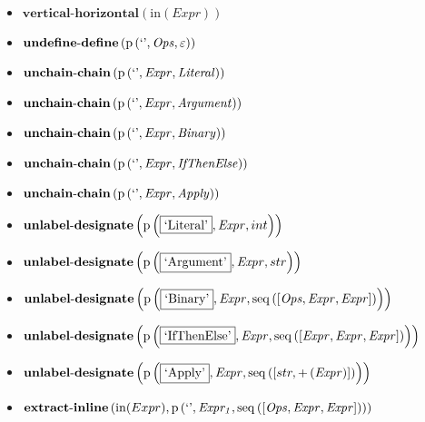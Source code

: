{\begin{itemize}
\item $\mathbf{vertical\text{-}horizontal}\left(\mathrm{in}(Expr)\right)$
\item $\mathbf{undefine\text{-}define}\\\left(\mathrm{p}\left(\text{`'},\mathit{Ops},\varepsilon\right)\right)$
\item $\mathbf{unchain\text{-}chain}\\\left(\mathrm{p}\left(\text{`'},\mathit{Expr},\mathit{Literal}\right)\right)$
\item $\mathbf{unchain\text{-}chain}\\\left(\mathrm{p}\left(\text{`'},\mathit{Expr},\mathit{Argument}\right)\right)$
\item $\mathbf{unchain\text{-}chain}\\\left(\mathrm{p}\left(\text{`'},\mathit{Expr},\mathit{Binary}\right)\right)$
\item $\mathbf{unchain\text{-}chain}\\\left(\mathrm{p}\left(\text{`'},\mathit{Expr},\mathit{IfThenElse}\right)\right)$
\item $\mathbf{unchain\text{-}chain}\\\left(\mathrm{p}\left(\text{`'},\mathit{Expr},\mathit{Apply}\right)\right)$
\item $\mathbf{unlabel\text{-}designate}\\\left(\mathrm{p}\left(\fbox{\text{`Literal'}},\mathit{Expr},int\right)\right)$
\item $\mathbf{unlabel\text{-}designate}\\\left(\mathrm{p}\left(\fbox{\text{`Argument'}},\mathit{Expr},str\right)\right)$
\item $\mathbf{unlabel\text{-}designate}\\\left(\mathrm{p}\left(\fbox{\text{`Binary'}},\mathit{Expr},\mathrm{seq}\left(\left[\mathit{Ops}, \mathit{Expr}, \mathit{Expr}\right]\right)\right)\right)$
\item $\mathbf{unlabel\text{-}designate}\\\left(\mathrm{p}\left(\fbox{\text{`IfThenElse'}},\mathit{Expr},\mathrm{seq}\left(\left[\mathit{Expr}, \mathit{Expr}, \mathit{Expr}\right]\right)\right)\right)$
\item $\mathbf{unlabel\text{-}designate}\\\left(\mathrm{p}\left(\fbox{\text{`Apply'}},\mathit{Expr},\mathrm{seq}\left(\left[str, {+}\left(\mathit{Expr}\right)\right]\right)\right)\right)$
\item $\mathbf{extract\text{-}inline}\left(\mathrm{in}(Expr),\\\mathrm{p}\left(\text{`'},\mathit{Expr_1},\mathrm{seq}\left(\left[\mathit{Ops}, \mathit{Expr}, \mathit{Expr}\right]\right)\right)\right)$

\end{itemize}}
